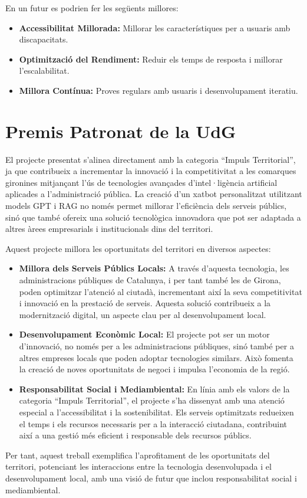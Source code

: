 \documentclass[a4paper,12pt,oneside]{ThesisStyle}
\begin{document}
En un futur es podrien fer les següents millores:

\begin{itemize}
    \item \textbf{Accessibilitat Millorada:} Millorar les característiques per a usuaris amb discapacitats.
    \item \textbf{Optimització del Rendiment:} Reduir els temps de resposta i millorar l'escalabilitat.
    \item \textbf{Millora Contínua:} Proves regulars amb usuaris i desenvolupament iteratiu.
\end{itemize}

\section{Premis Patronat de la UdG}
\label{sec:awards}

El projecte presentat s'alinea directament amb la categoria ``Impuls Territorial'', ja que contribueix a incrementar la innovació i la competitivitat a les comarques gironines mitjançant l'ús de tecnologies avançades d'intel·ligència artificial aplicades a l'administració pública. La creació d'un xatbot personalitzat utilitzant models GPT i RAG no només permet millorar l'eficiència dels serveis públics, sinó que també ofereix una solució tecnològica innovadora que pot ser adaptada a altres àrees empresarials i institucionals dins del territori.

Aquest projecte millora les oportunitats del territori en diversos aspectes:

\begin{itemize}
    \item \textbf{Millora dels Serveis Públics Locals:} A través d'aquesta tecnologia, les administracions públiques de Catalunya, i per tant també les de Girona, poden optimitzar l'atenció al ciutadà, incrementant així la seva competitivitat i innovació en la prestació de serveis. Aquesta solució contribueix a la modernització digital, un aspecte clau per al desenvolupament local.
    \item \textbf{Desenvolupament Econòmic Local:} El projecte pot ser un motor d'innovació, no només per a les administracions públiques, sinó també per a altres empreses locals que poden adoptar tecnologies similars. Això fomenta la creació de noves oportunitats de negoci i impulsa l'economia de la regió.
    \item \textbf{Responsabilitat Social i Mediambiental:} En línia amb els valors de la categoria ``Impuls Territorial'', el projecte s'ha dissenyat amb una atenció especial a l'accessibilitat i la sostenibilitat. Els serveis optimitzats redueixen el temps i els recursos necessaris per a la interacció ciutadana, contribuint així a una gestió més eficient i responsable dels recursos públics.
\end{itemize}

Per tant, aquest treball exemplifica l'aprofitament de les oportunitats del territori, potenciant les interaccions entre la tecnologia desenvolupada i el desenvolupament local, amb una visió de futur que inclou responsabilitat social i mediambiental.
\end{document}
